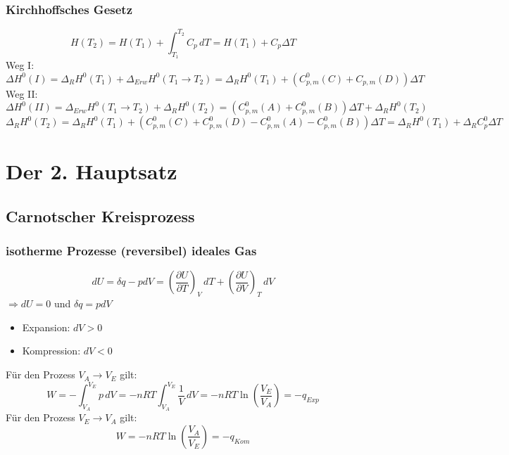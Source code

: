 \documentclass[a4paper]{article}
\begin{document}
\subsubsection{Kirchhoffsches Gesetz}
\begin{equation*}
    H(T_2) = H(T_1) + \int_{T_1}^{T_2} C_p \, dT = H(T_1)+C_p \Delta T
\end{equation*}
Weg I:
\begin{equation*}
    \Delta H^0 (I) = \Delta_RH^0 (T_1) + \Delta_{Erw} H^0 (T_1 \rightarrow T_2) = \Delta_RH^0(T_1) + (C_{p,m}^0(C) + C_{p,m}(D)) \Delta T
\end{equation*}
Weg II:
\begin{equation*}
    \Delta H^0 (II) = \Delta_{Erw} H^0 (T_1 \rightarrow T_2) + \Delta_RH^0 (T_2) = (C_{p,m}^0 (A) + C_{p,m}^0 (B))\Delta T + \Delta_RH^0 (T_2)
\end{equation*}
\begin{equation*}
    \Delta_RH^0 (T_2) = \Delta_RH^0 (T_1) + (C_{p,m}^0 (C)+C_{p,m}^0 (D)-C_{p,m}^0(A)-C_{p,m}^0(B)) \Delta T = \Delta_RH^0 (T_1) + \Delta_RC_p^0 \Delta T
\end{equation*}

\section{Der 2. Hauptsatz}
\subsection{Carnotscher Kreisprozess}
\subsubsection{isotherme Prozesse (reversibel) ideales Gas}
\begin{equation*}
    dU = \delta q - pdV = \left(\frac{\partial U}{\partial T}\right)_V \, dT + \left(\frac{\partial U}{\partial V}\right)_T \, dV
\end{equation*}
$\Rightarrow dU = 0$ und $\delta q = pdV$\\
\begin{itemize}
    \item[] Expansion: $dV>0$
    \item[] Kompression: $dV<0$
\end{itemize}
Für den Prozess $V_A \rightarrow V_E$ gilt:
\begin{equation*}
    W = - \int_{V_A}^{V_E} p \, dV = -nRT \int_{V_A}^{V_E} \frac{1}{V} \, dV = -nRT \ln\left(\frac{V_E}{V_A}\right) = -q_{Exp}
\end{equation*}
Für den Prozess $V_E \rightarrow V_A$ gilt:
\begin{equation*}
    W = -nRT \ln\left(\frac{V_A}{V_E}\right)=-q_{Kom}
\end{equation*}
\end{document}
